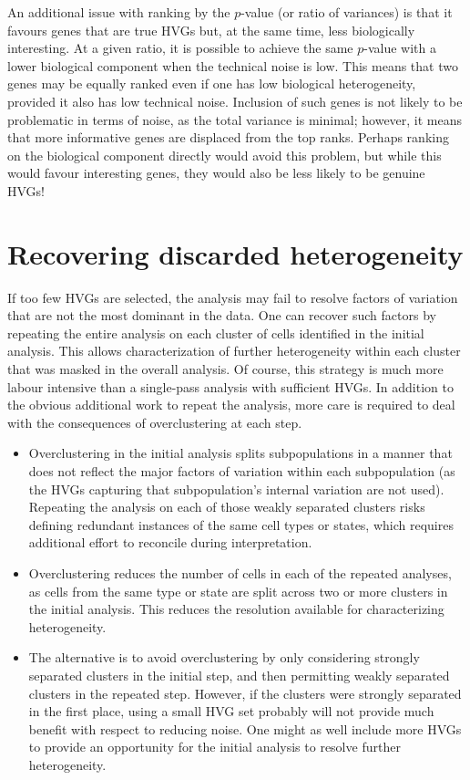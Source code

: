 \documentclass{article}
\begin{document}
An additional issue with ranking by the $p$-value (or ratio of variances) is that it favours genes that are true HVGs but, at the same time, less biologically interesting.
At a given ratio, it is possible to achieve the same $p$-value with a lower biological component when the technical noise is low.
This means that two genes may be equally ranked even if one has low biological heterogeneity, provided it also has low technical noise.
Inclusion of such genes is not likely to be problematic in terms of noise, as the total variance is minimal;
however, it means that more informative genes are displaced from the top ranks.
Perhaps ranking on the biological component directly would avoid this problem, but while this would favour interesting genes, they would also be less likely to be genuine HVGs!

\section{Recovering discarded heterogeneity}
If too few HVGs are selected, the analysis may fail to resolve factors of variation that are not the most dominant in the data.
One can recover such factors by repeating the entire analysis on each cluster of cells identified in the initial analysis.
This allows characterization of further heterogeneity within each cluster that was masked in the overall analysis.
Of course, this strategy is much more labour intensive than a single-pass analysis with sufficient HVGs.
In addition to the obvious additional work to repeat the analysis,
more care is required to deal with the consequences of overclustering at each step.
\begin{itemize}
\item Overclustering in the initial analysis splits subpopulations in a manner that does not reflect the major factors of variation within each subpopulation (as the HVGs capturing that subpopulation's internal variation are not used).
Repeating the analysis on each of those weakly separated clusters risks defining redundant instances of the same cell types or states, which requires additional effort to reconcile during interpretation.
\item Overclustering reduces the number of cells in each of the repeated analyses,
as cells from the same type or state are split across two or more clusters in the initial analysis.
This reduces the resolution available for characterizing heterogeneity.
\item The alternative is to avoid overclustering by only considering strongly separated clusters in the initial step,
and then permitting weakly separated clusters in the repeated step.
However, if the clusters were strongly separated in the first place,
using a small HVG set probably will not provide much benefit with respect to reducing noise.
One might as well include more HVGs to provide an opportunity for the initial analysis to resolve further heterogeneity.
\end{itemize}
\end{document}
